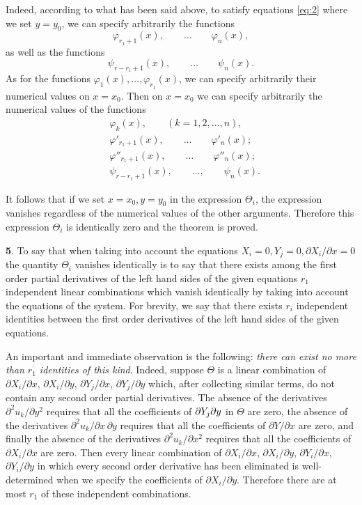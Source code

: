 \documentclass[leqno,11pt]{article}
\newcommand{\pd}{\partial}
\theoremstyle{shape1}
\theoremstyle{shape0}
\theoremstyle{shape2}
\theoremstyle{definition}
\begin{document}
Indeed, according to what has been said above, to satisfy equations \eqref{eq:2} where we set $y=y_{0}$, we can specify arbitrarily the functions
\[
\varphi_{r_{1}+1}(x),\qquad\dots\qquad\varphi_{n}(x),
\]
as well as the functions
\[
\psi_{r-r_{1}+1}(x),\qquad\dots\qquad\psi_{n}(x).
\]
As for the functions $\varphi_{1}(x), \dots,\varphi_{r_{1}}(x)$, we can specify arbitrarily their numerical values on $x=x_{0}$. Then on $x=x_{0}$ we can specify arbitrarily the numerical values of the functions
\begin{align*}
  &\varphi_{k}(x),\qquad(k=1,2,\dots,n),\\
  &\varphi'_{r_{1}+1}(x),\qquad\dots\qquad\varphi'_{n}(x);\\
  &\varphi''_{r_{1}+1}(x),\qquad\dots\qquad\varphi''_{n}(x);\\
  &\psi_{r-r_{1}+1}(x),\qquad\dots,\qquad\psi_{n}(x).
\end{align*}

It follows that if we set $x=x_{0},y=y_{0}$ in the expression $\Theta_{i}$, the expression vanishes regardless of the numerical values of the other arguments. Therefore this expression $\Theta_{i}$ is identically zero and the theorem is proved.

\vspace{12pt}

\textbf{5}. To say that when taking into account the equations $X_{i}=0,Y_{j}=0,\pd X_{i}/\pd x=0$ the quantity $\Theta_{i}$ vanishes identically is to say that there exists among the first order partial derivatives of the left hand sides of the given equations $r_{1}$ independent linear combinations which vanish identically by taking into account the equations of the system. For brevity, we say that there exists $r_{i}$ independent identities between the first order derivatives of the left hand sides of the given equations.

An important and immediate observation is the following: \emph{there can exist no more than $r_{1}$ identities of this kind}. Indeed, suppose $\Theta$ is a linear combination of $\pd X_{i}/\pd x$, $\pd X_{i}/\pd y$, $\pd Y_{j}/\pd x$, $\pd Y_{j}/\pd y$ which, after collecting similar terms, do not contain any second order partial derivatives. The absence of the derivatives $\pd^{2}u_{k}/\pd y^{2}$ requires that all the coefficients of $\pd Y_{j}\/\pd y$ in $\Theta$ are zero, the absence of the derivatives $\pd ^{2}u_{k}/\pd x\,\pd y$ requires that all the coefficients of $\pd Y/\pd x$ are zero, and finally the absence of the derivatives $\pd ^{2}u_{k}/\pd x^{2}$ requires that all the coefficients of $\pd X_{i}/\pd x$ are zero. Then every linear combination of $\pd X_{i}/\pd x$, $\pd X_{i}/\pd y$, $\pd Y_{i}/\pd x$, $\pd Y_{i}/\pd y$ in which every second order derivative has been eliminated is well-determined when we specify the coefficients of $\pd X_{i}/\pd y$. Therefore there are at most $r_{1}$ of these independent combinations.
\end{document}
